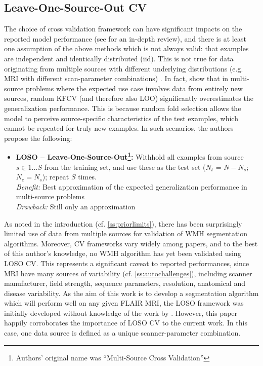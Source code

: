 \subsection{Leave-One-Source-Out CV}
The choice of cross validation framework can have significant impacts on the reported model performance (see \cite{Arlot2010} for an in-depth review), and there is at least one assumption of the above methods which is not always valid: that examples are independent and identically distributed (iid). This is not true for data originating from multiple sources with different underlying distributions (e.g. MRI with different scan-parameter combinations) \cite{Geras2013}. In fact, \citeauthor{Geras2013} show that in multi-source problems where the expected use case involves data from entirely new sources, random KFCV (and therefore also LOO) significantly overestimates the generalization performance. This is because random fold selection allows the model to perceive source-specific characteristics of the test examples, which cannot be repeated for truly new examples. In such scenarios, the authors propose the following:
\begin{itemize}
  \item \textbf{LOSO -- Leave-One-Source-Out\footnote{Authors' original name was ``Multi-Source Cross Validation''}:} Withhold all examples from source $s\in 1\dots S$ from the training set, and use these as the test set ($N_t$ = $N-N_s$; $N_e = N_s$); repeat $S$ times.
  \\\textit{Benefit:} Best approximation of the expected generalization performance in multi-source problems
  \\\textit{Drawback:} Still only an approximation
\end{itemize}
As noted in the introduction (cf. \ref{ss:priorlimits}), there has been surprisingly limited use of data from multiple sources for validation of WMH segmentation algorithms. Moreover, CV frameworks vary widely among papers, and to the best of this author's knowledge, no WMH algorithm has yet been validated using LOSO CV. This represents a significant caveat to reported performances, since MRI have many sources of variability (cf. \ref{ss:autochallenges}), including scanner manufacturer, field strength, sequence parameters, resolution, anatomical and disease variability. As the aim of this work is to develop a segmentation algorithm which will perform well on any given FLAIR MRI, the LOSO framework was initially developed without knowledge of the work by \citeauthor{Geras2013}. However, this paper happily corroborates the importance of LOSO CV to the current work. In this case, one data source is defined as a unique scanner-parameter combination.
